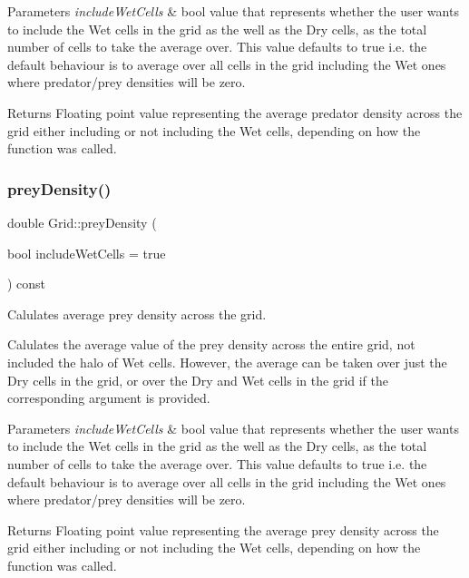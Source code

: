 \begin{DoxyParams}{Parameters}
{\em include\+Wet\+Cells} & bool value that represents whether the user wants to include the Wet cells in the grid as the well as the Dry cells, as the total number of cells to take the average over. This value defaults to true i.\+e. the default behaviour is to average over all cells in the grid including the Wet ones where predator/prey densities will be zero.\\
\hline
\end{DoxyParams}
\begin{DoxyReturn}{Returns}
Floating point value representing the average predator density across the grid either including or not including the Wet cells, depending on how the function was called. 
\end{DoxyReturn}
\mbox{\label{class_grid_a7dc8ae18c31e8e680f6369d7c07ea881}} 
\subsubsection{\texorpdfstring{prey\+Density()}{preyDensity()}}
{\footnotesize\ttfamily double Grid\+::prey\+Density (\begin{DoxyParamCaption}\item[{bool}]{include\+Wet\+Cells = {\ttfamily true} }\end{DoxyParamCaption}) const}



Calulates average prey density across the grid. 

Calulates the average value of the prey density across the entire grid, not included the halo of Wet cells. However, the average can be taken over just the Dry cells in the grid, or over the Dry and Wet cells in the grid if the corresponding argument is provided.


\begin{DoxyParams}{Parameters}
{\em include\+Wet\+Cells} & bool value that represents whether the user wants to include the Wet cells in the grid as the well as the Dry cells, as the total number of cells to take the average over. This value defaults to true i.\+e. the default behaviour is to average over all cells in the grid including the Wet ones where predator/prey densities will be zero.\\
\hline
\end{DoxyParams}
\begin{DoxyReturn}{Returns}
Floating point value representing the average prey density across the grid either including or not including the Wet cells, depending on how the function was called. 
\end{DoxyReturn}
\mbox{\label{class_grid_a4971cb9d47440bc63488993d5647f943}} 
